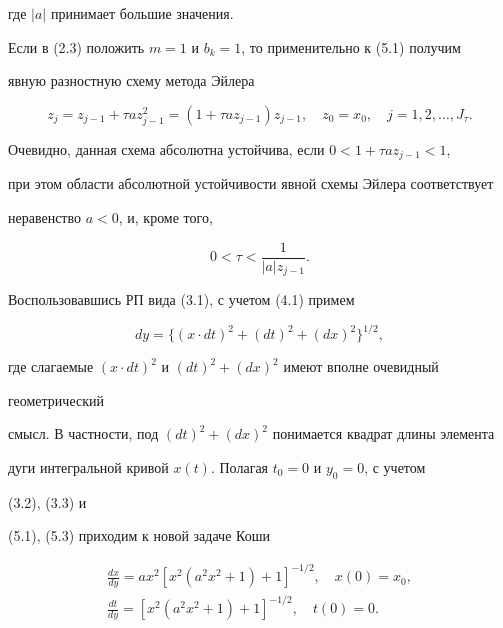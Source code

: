 где $|a|$ принимает большие значения. 


 


Если в (2.3) положить $m=1$ и $b_k=1$, то применительно к (5.1) получим 


явную разностную схему метода Эйлера 


$$ 


z_j=z_{j-1}+\tau a z^2_{j-1}=(1+\tau a z_{j-1})z_{j-1},\quad 


z_0=x_0,\quad j=1,2,\dotsc,J_\tau. 


$$ 


Очевидно, данная схема абсолютна устойчива, если $0<1+\tau a z_{j-1}<1$, 


при этом области абсолютной устойчивости явной схемы Эйлера соответствует 


неравенство $a<0$, и, кроме того, 


\begin{equation} 


0<\tau<\frac{1}{|a|z_{j-1}}. 


\end{equation} 


 


Воспользовавшись РП вида (3.1), с учетом (4.1) примем 


\begin{equation} 


dy=\{(x\cdot dt)^2+(dt)^2+(dx)^2\}^{1/2}, 


\end{equation} 


где слагаемые $(x\cdot dt)^2$ и $(dt)^2+(dx)^2$ имеют вполне очевидный 


геометрический 


смысл. В частности, под $(dt)^2+(dx)^2$ понимается квадрат длины элемента 


дуги интегральной кривой $x(t)$. Полагая $t_0=0$ и $y_0=0$, с учетом 


(3.2), (3.3) и 


(5.1), (5.3) приходим к новой задаче Коши 


\begin{gather} 


\frac{dx}{dy}=ax^2[x^2(a^2x^2+1)+1]^{-1/2},\quad x(0)=x_0,\\ 


% 


\frac{dt}{dy}=[x^2(a^2x^2+1)+1]^{-1/2},\quad t(0)=0. 


\end{gather} 


